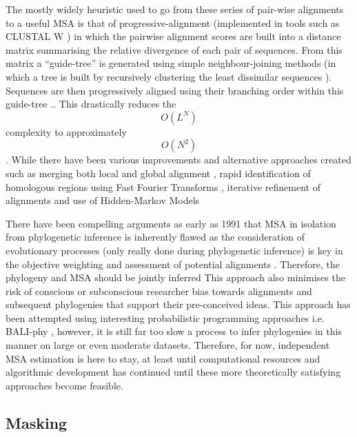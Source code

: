 The mostly widely heuristic used to go from these series of pair-wise alignments to
a useful MSA is that of progressive-alignment \citep{Feng1987} (implemented in 
tools such as CLUSTAL W \citep{Thompson1994}) in which the pairwise alignment
scores are built into a distance matrix summarising the relative divergence of 
each pair of sequences. From this matrix a ``guide-tree'' is generated using simple
neighbour-joining methods (in which a tree is built by recursively clustering
the least dissimilar sequences \citep{Saitou1987}).  Sequences are then progressively
aligned using their branching order within this guide-tree \citep{Thompson1994}..
This drastically reduces the \[O(L^{N})\] complexity to approximately \[O(N^{2})\]
\citep{Sievers2011}. While there have been various improvements and alternative approaches
created such as merging both local and global alignment \citep{Notredame2000}, 
rapid identification of homologous regions using Fast Fourier Transforms \citep{Katoh2002},
iterative refinement of alignments \citep{Edgar2004a} and use of Hidden-Markov Models \citep{Eddy1995}


There have been compelling arguments as early as 1991 that MSA in isolation from
phylogenetic inference is inherently flawed as the consideration of 
evolutionary processes (only really done during phylogenetic inference) 
is key in the objective weighting and assessment of potential alignments \citep{Thorne1991}.
Therefore, the phylogeny and MSA should be jointly inferred \citep{Thorne1991,Redelings2005,Bouchard-Cote2013}
This approach also minimises the risk of conscious or subconscious researcher bias 
towards alignments and subsequent phylogenies that support their pre-conceived ideas.
This approach has been attempted using interesting probabilistic programming approaches
i.e. BALI-phy \citep{Suchard2006}, however, it is still far too
slow a process to infer phylogenies in this manner on large or even moderate datasets.
Therefore, for now, independent MSA estimation is here to stay, at least until
computational resources and algorithmic development has continued until these more
theoretically satisfying approaches become feasible.



\subsection{Masking}

